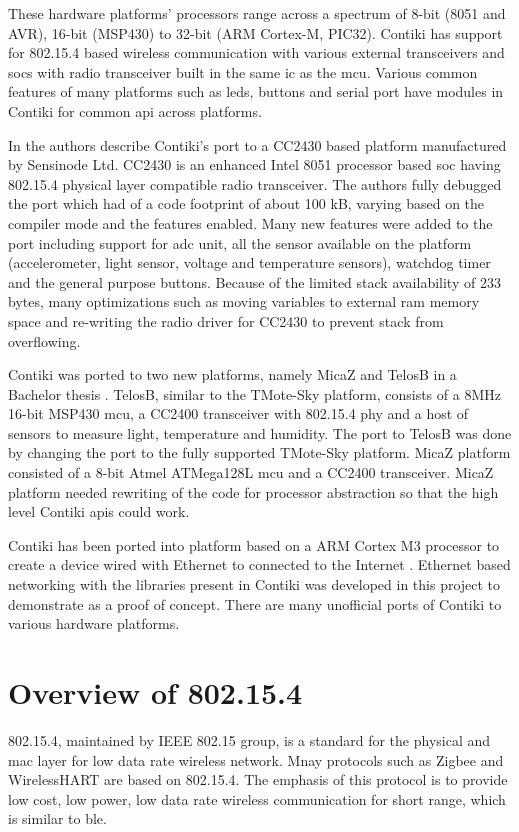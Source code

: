 These hardware platforms' processors range across a spectrum of 8-bit (8051 and AVR), 16-bit (MSP430) to 32-bit (ARM Cortex-M, PIC32). Contiki has support for 802.15.4 based wireless communication with various external transceivers and \glspl{soc} with radio transceiver built in the same \gls{ic} as the \gls{mcu}. Various common features of many platforms such as \glspl{led}, buttons and serial port have modules in Contiki for common \gls{api} across platforms.

In \cite{Oikonomou2011} the authors describe Contiki's port to a CC2430 based platform manufactured by Sensinode Ltd. CC2430 is an enhanced Intel 8051 processor based \gls{soc} having 802.15.4 physical layer compatible radio transceiver. The authors fully debugged the port which had of a code footprint of about 100 kB, varying based on the compiler mode and the features enabled. Many new features were added to the port including support for \gls{adc} unit, all the sensor available on the platform (accelerometer, light sensor, voltage and temperature sensors), watchdog timer and the general purpose buttons. Because of the limited stack availability of 233 bytes, many optimizations such as moving variables to external \gls{ram} memory space and re-writing the radio driver for CC2430 to prevent stack from overflowing.

Contiki was ported to two new platforms, namely MicaZ and TelosB in a Bachelor thesis \cite{stan2007porting}. TelosB, similar to the TMote-Sky platform, consists of a 8MHz 16-bit MSP430 \gls{mcu}, a CC2400 transceiver with 802.15.4 \gls{phy} and a host of sensors to measure light, temperature and humidity. The port to TelosB was done by changing the port to the fully supported TMote-Sky platform. MicaZ platform consisted of a 8-bit Atmel ATMega128L \gls{mcu} and a CC2400 transceiver. MicaZ platform needed rewriting of the code for processor abstraction so that the high level Contiki \glspl{api} could work.

Contiki has been ported into platform based on a ARM Cortex M3 processor to create a device wired with Ethernet to connected to the Internet \cite{Wilde2013a}. Ethernet based networking with the libraries present in Contiki was developed in this project to demonstrate as a proof of concept. There are many unofficial ports of Contiki to various hardware platforms.

\section{Overview of 802.15.4} \label{Overview15.4}
802.15.4, maintained by IEEE 802.15 group, is a standard for the physical and \gls{mac} layer for low data rate wireless network\cite{IEEE802154}. Mnay protocols such as Zigbee and WirelessHART are based on 802.15.4. The emphasis of this protocol is to provide low cost, low power, low data rate wireless communication for short range, which is similar to \gls{ble}.

